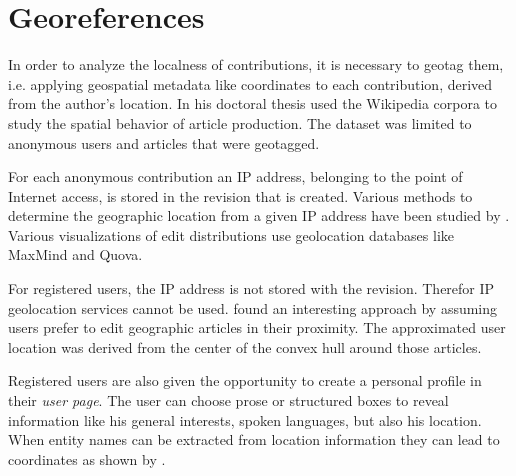 \section{Georeferences}\label{sec:georeference}


In order to analyze the localness of contributions, it is necessary to geotag them, i.e. applying geospatial metadata like coordinates to each contribution, derived from the author's location.
In his doctoral thesis \textcite{hardy2011volunteered} used the Wikipedia corpora to study the spatial behavior of article production.
The dataset was limited to anonymous users and articles that were geotagged.

For each anonymous contribution an IP address, belonging to the point of Internet access, is stored in the revision that is created.
Various methods to determine the geographic location from a given IP address have been studied by \textcite{muir2009internet}.
Various visualizations  of edit distributions use geolocation databases like MaxMind and Quova.

For registered users, the IP address is not stored with the revision.
Therefor IP geolocation services cannot be used.
\textcite{lieberman2009you} found an interesting approach by assuming users prefer to edit geographic articles in their proximity.
The approximated user location was derived from the center of the convex hull around those articles.

Registered users are also given the opportunity to create a personal profile in their \emph{user page}.
The user can choose prose or structured boxes to reveal information like his general interests, spoken languages, but also his location.
When entity names can be extracted from location information they can lead to coordinates as shown by \textcite{hecht2010localness}.